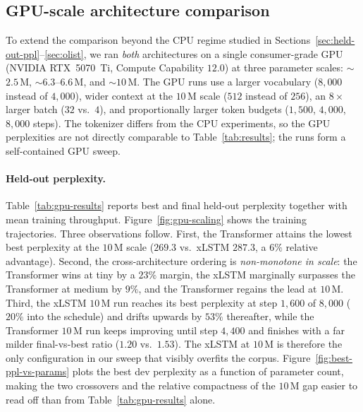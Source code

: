 \documentclass[11pt]{article}
\begin{document}
\subsection{GPU-scale architecture comparison}\label{sec:gpu-scaling}

To extend the comparison beyond the CPU regime studied in
Sections~\ref{sec:held-out-ppl}--\ref{sec:olist}, we ran \emph{both}
architectures on a single consumer-grade GPU (NVIDIA RTX~5070~Ti,
Compute Capability $12.0$) at three parameter scales: $\sim$$2.5$\,M,
$\sim$$6.3$--$6.6$\,M, and $\sim$$10$\,M. The GPU runs use a larger
vocabulary ($8{,}000$ instead of $4{,}000$), wider context at the
$10$\,M scale ($512$ instead of $256$), an $8\times$ larger batch
($32$ vs.\ $4$), and proportionally larger token budgets ($1{,}500$,
$4{,}000$, $8{,}000$ steps). The tokenizer differs from the CPU
experiments, so the GPU perplexities are not directly comparable to
Table~\ref{tab:results}; the runs form a self-contained GPU sweep.

\paragraph{Held-out perplexity.}
Table~\ref{tab:gpu-results} reports best and final held-out
perplexity together with mean training throughput.
Figure~\ref{fig:gpu-scaling} shows the training trajectories. Three
observations follow. First, the Transformer attains the lowest best
perplexity at the $10$\,M scale ($269.3$ vs.\ xLSTM $287.3$, a $6\%$
relative advantage). Second, the cross-architecture ordering is
\emph{non-monotone in scale}: the Transformer wins at tiny by a
$23\%$ margin, the xLSTM marginally surpasses the Transformer at
medium by $9\%$, and the Transformer regains the lead at $10$\,M.
Third, the xLSTM $10$\,M run reaches its best perplexity at step
$1{,}600$ of $8{,}000$ ($20\%$ into the schedule) and drifts
upwards by $53\%$ thereafter, while the Transformer $10$\,M run
keeps improving until step $4{,}400$ and finishes with a far milder
final-vs-best ratio ($1.20$ vs.\ $1.53$). The xLSTM at $10$\,M is
therefore the only configuration in our sweep that visibly overfits
the corpus. Figure~\ref{fig:best-ppl-vs-params} plots the best dev
perplexity as a function of parameter count, making the two
crossovers and the relative compactness of the $10$\,M gap easier
to read off than from Table~\ref{tab:gpu-results} alone.
\end{document}
